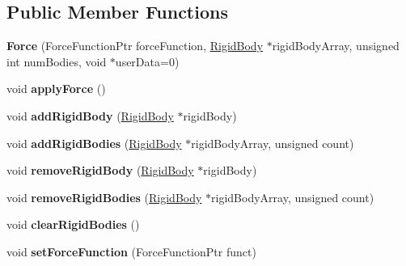 \subsection*{Public Member Functions}
\begin{DoxyCompactItemize}
\item 
\hypertarget{class_rigid2_d_1_1_force_a347c149794a7ea522f2888ee3295ca7e}{
{\bfseries Force} (ForceFunctionPtr forceFunction, \hyperlink{class_rigid2_d_1_1_rigid_body}{RigidBody} $\ast$rigidBodyArray, unsigned int numBodies, void $\ast$userData=0)}
\label{class_rigid2_d_1_1_force_a347c149794a7ea522f2888ee3295ca7e}

\item 
\hypertarget{class_rigid2_d_1_1_force_ac961a0c4a3ab8d04f4fd3921294e2533}{
void {\bfseries applyForce} ()}
\label{class_rigid2_d_1_1_force_ac961a0c4a3ab8d04f4fd3921294e2533}

\item 
\hypertarget{class_rigid2_d_1_1_force_abef86ee70ce7029df668999aa54335e7}{
void {\bfseries addRigidBody} (\hyperlink{class_rigid2_d_1_1_rigid_body}{RigidBody} $\ast$rigidBody)}
\label{class_rigid2_d_1_1_force_abef86ee70ce7029df668999aa54335e7}

\item 
\hypertarget{class_rigid2_d_1_1_force_a06e4f7846692e6e7b6a1a7f6de9bbc66}{
void {\bfseries addRigidBodies} (\hyperlink{class_rigid2_d_1_1_rigid_body}{RigidBody} $\ast$rigidBodyArray, unsigned count)}
\label{class_rigid2_d_1_1_force_a06e4f7846692e6e7b6a1a7f6de9bbc66}

\item 
\hypertarget{class_rigid2_d_1_1_force_a6072444ba146a6af0ccdbcce0b36b146}{
void {\bfseries removeRigidBody} (\hyperlink{class_rigid2_d_1_1_rigid_body}{RigidBody} $\ast$rigidBody)}
\label{class_rigid2_d_1_1_force_a6072444ba146a6af0ccdbcce0b36b146}

\item 
\hypertarget{class_rigid2_d_1_1_force_a0f0eb4c3f647975d59bae8c614ca0b6f}{
void {\bfseries removeRigidBodies} (\hyperlink{class_rigid2_d_1_1_rigid_body}{RigidBody} $\ast$rigidBodyArray, unsigned count)}
\label{class_rigid2_d_1_1_force_a0f0eb4c3f647975d59bae8c614ca0b6f}

\item 
\hypertarget{class_rigid2_d_1_1_force_a75eda1213a351790d3c69a2eb7f603d6}{
void {\bfseries clearRigidBodies} ()}
\label{class_rigid2_d_1_1_force_a75eda1213a351790d3c69a2eb7f603d6}

\item 
\hypertarget{class_rigid2_d_1_1_force_ad6d3bdb7501b078fa06b0bcbe8b26f5c}{
void {\bfseries setForceFunction} (ForceFunctionPtr funct)}
\label{class_rigid2_d_1_1_force_ad6d3bdb7501b078fa06b0bcbe8b26f5c}


\end{DoxyCompactItemize}
